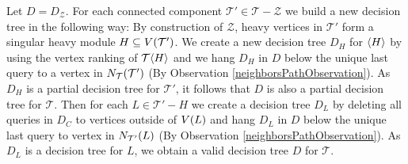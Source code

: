 Let $D = D_{\mathcal{Z}}$. For each connected component $\mathcal{T}'\in \mathcal{T}-\mathcal{Z}$ we build a new decision tree in the following way: By construction of $\mathcal{Z}$, heavy vertices in $\mathcal{T}'$ form a singular heavy module $H\subseteq V\mathopen{}\left( \mathcal{T}' \right)$. We create a new decision tree $D_H$ for $\mathopen{}\langle H \rangle$ by using the vertex ranking of $\mathcal{T}\mathopen{}\langle H \rangle$ and we hang $D_{H}$ in $D$ below the unique last query to a vertex in $N_\mathcal{T}\mathopen{}\left( \mathcal{T}' \right)$ (By Observation \ref{neighborsPathObservation}). As $D_H$ is a partial decision tree for $\mathcal{T}'$, it follows that $D$ is also a partial decision tree for $\mathcal{T}$. Then for each $L\in \mathcal{T}'-H$ we create a decision tree $D_L$ by deleting all queries in $D_C$ to vertices outside of $V\mathopen{}\left( L \right)$ and hang $D_L$ in $D$ below the unique last query to vertex in $N_{\mathcal{T}'}\mathopen{}\left( L \right)$ (By Observation \ref{neighborsPathObservation}). As $D_L$ is a decision tree for $L$, we obtain a valid decision tree $D$ for $\mathcal{T}$.

